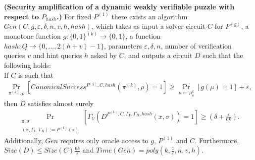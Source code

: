 \begin{lemma}\textbf{(Security amplification of a dynamic weakly verifiable puzzle with respect to $P_{hash}$.)}
  \label{lemma:sec_amp_for_p_hash}
  For fixed $P^{(1)}$ there exists an algorithm $Gen(C, g, \varepsilon, \delta, n, v, h, hash)$,
  which takes as input a solver circuit $C$ for $P^{(g)}$, a monotone function $g:\{0,1\}^{(k)} \rightarrow \{0,1\}$,
  a function $hash : Q \rightarrow \{0, \dots, 2(h+v)-1\}$, parameters $\varepsilon, \delta, n$,
  number of verification queries $v$ and hint queries $h$ asked by $C$, and outputs a circuit $D$
  such that the following holds: \\
  If $C$ is such that \\
  \begin{align*}
    \underset{\pi^{(k)}, \rho}{\Pr}\left[CanonicalSuccess^{P^{(g)}, C, hash}(\pi^{(k)}, \rho)=1\right] \geq \underset{\mu \leftarrow \mu_\delta^k}{\Pr}[g(\mu) = 1] + \varepsilon,
  \end{align*}
  then $D$ satisfies almost surely
  \begin{align*}
    \underset{\substack{\pi, \sigma \\ (x,\Gamma_V,\Gamma_H) := P^{(1)}(\pi)}}{\Pr}\left[\Gamma_V(D^{P^{(1)},C,\Gamma_V, \Gamma_H, hash}(x, \sigma)) = 1\right] \geq (\delta + \frac{\varepsilon}{6k}).
  \end{align*}
  Additionally, $Gen$ requires only oracle access to $g$, $P^{(1)}$ and $C$.
  Furthermore, $Size(D) \leq Size(C)\frac{6k}{\varepsilon}$ and $Time(Gen) = poly(k, \frac{1}{\varepsilon}, n, v, h)$.
\end{lemma}
%
